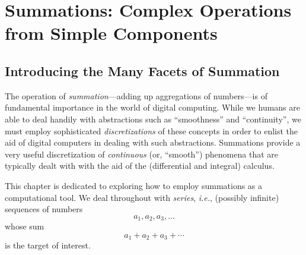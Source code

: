 
\chapter{Summations:
Complex Operations from Simple Components}
\label{ch:Summation}


\section{Introducing the Many Facets of Summation}
\label{sec:intro}

The operation of {\it summation}---adding up aggregations of numbers---is of fundamental importance in the world of digital computing.  While we humans are able to deal handily with abstractions such as ``smoothness'' and ``continuity'', we must employ sophisticated {\em discretizations} of these concepts in order to enlist the aid of digital computers in dealing with such abstractions.  Summations provide a very useful discretization of {\em continuous} (or,
``smooth'') phenomena that are typically dealt with with the aid of the (differential and integral) calculus.

\medskip

This chapter is dedicated to exploring how to employ summations as a computational tool.  We deal throughout with {\it series}, {\it i.e.}, (possibly infinite) sequences of numbers
\[ a_1, a_2, a_3, \ldots \]
whose sum
\begin{equation}
\label{eq:abstract-sum}
a_1 + a_2 + a_3 + \cdots
\end{equation}
is the target of interest.

\medskip

\noindent {}


